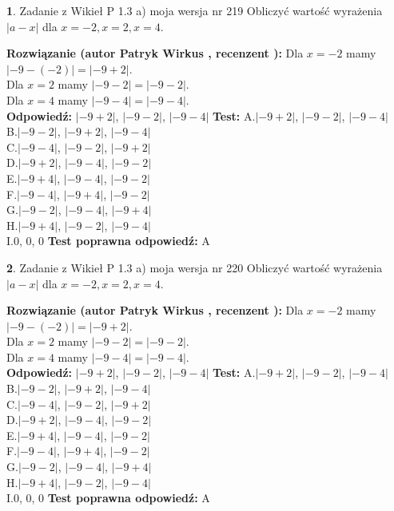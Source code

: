 \documentclass[12pt, a4paper]{article}
\theoremstyle{definition} %
\newtheorem{zad}{}
\newcommand{\zadStart}[1]{\begin{zad}#1\newline}
\newcommand{\zadStop}{\end{zad}}
\newcommand{\rozwStart}[2]{\noindent \textbf{Rozwiązanie (autor #1 , recenzent #2): }\newline}
\newcommand{\rozwStop}{\newline}
\newcommand{\odpStart}{\noindent \textbf{Odpowiedź:}\newline}
\newcommand{\odpStop}{\newline}
\newcommand{\testStart}{\noindent \textbf{Test:}\newline}
\newcommand{\testStop}{\newline}
\newcommand{\kluczStart}{\noindent \textbf{Test poprawna odpowiedź:}\newline}
\newcommand{\kluczStop}{\newline}
\begin{document}
\zadStart{Zadanie z Wikieł P 1.3 a) moja wersja nr 219}
Obliczyć wartość wyrażenia $|a - x|$ dla $x=-2,x=2,x=4$.
\zadStop
\rozwStart{Patryk Wirkus}{}
Dla $x = -2$ mamy $|-9 - (-2)| = |-9 + 2|$.\\
Dla $x = 2$ mamy $|-9 - 2| = |-9 - 2|$.\\
Dla $x = 4$ mamy $|-9 - 4| = |-9 - 4|$.\\
\rozwStop
\odpStart
$|-9 + 2|$, $|-9 - 2|$, $|-9 - 4|$
\odpStop
\testStart
A.$|-9 + 2|$, $|-9 - 2|$, $|-9 - 4|$\\
B.$|-9 - 2|$, $|-9 + 2|$, $|-9 - 4|$\\
C.$|-9 - 4|$, $|-9 - 2|$, $|-9 + 2|$\\
D.$|-9 + 2|$, $|-9 - 4|$, $|-9 - 2|$\\
E.$|-9 + 4|$, $|-9 - 4|$, $|-9 - 2|$\\
F.$|-9 - 4|$, $|-9 + 4|$, $|-9 - 2|$\\
G.$|-9 - 2|$, $|-9 - 4|$, $|-9 + 4|$\\
H.$|-9 + 4|$, $|-9 - 2|$, $|-9 - 4|$\\
I.$0$, $0$, $0$
\testStop
\kluczStart
A
\kluczStop



\zadStart{Zadanie z Wikieł P 1.3 a) moja wersja nr 220}
Obliczyć wartość wyrażenia $|a - x|$ dla $x=-2,x=2,x=4$.
\zadStop
\rozwStart{Patryk Wirkus}{}
Dla $x = -2$ mamy $|-9 - (-2)| = |-9 + 2|$.\\
Dla $x = 2$ mamy $|-9 - 2| = |-9 - 2|$.\\
Dla $x = 4$ mamy $|-9 - 4| = |-9 - 4|$.\\
\rozwStop
\odpStart
$|-9 + 2|$, $|-9 - 2|$, $|-9 - 4|$
\odpStop
\testStart
A.$|-9 + 2|$, $|-9 - 2|$, $|-9 - 4|$\\
B.$|-9 - 2|$, $|-9 + 2|$, $|-9 - 4|$\\
C.$|-9 - 4|$, $|-9 - 2|$, $|-9 + 2|$\\
D.$|-9 + 2|$, $|-9 - 4|$, $|-9 - 2|$\\
E.$|-9 + 4|$, $|-9 - 4|$, $|-9 - 2|$\\
F.$|-9 - 4|$, $|-9 + 4|$, $|-9 - 2|$\\
G.$|-9 - 2|$, $|-9 - 4|$, $|-9 + 4|$\\
H.$|-9 + 4|$, $|-9 - 2|$, $|-9 - 4|$\\
I.$0$, $0$, $0$
\testStop
\kluczStart
A
\kluczStop
\end{document}
